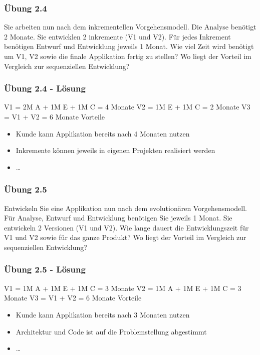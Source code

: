 \begin{frame}
\frametitle{Übung 2.4}
	Sie arbeiten nun nach dem inkrementellen Vorgehensmodell. Die Analyse benötigt 2 Monate. Sie
	entwicklen 2 inkremente (V1 und V2). Für jedes Inkrement benötigen Entwurf und Entwicklung jeweils
	1 Monat. Wie viel Zeit wird benötigt um V1, V2 sowie die finale Applikation fertig zu stellen?
	Wo liegt der Vorteil im Vergleich zur sequenziellen Entwicklung?
\end{frame}

\ifloesung
\begin{frame}
\frametitle{Übung 2.4 - Lösung}
	V1 = 2M A + 1M E + 1M C = 4 Monate
	\newline
	V2 = 1M E + 1M C = 2 Monate
	\newline
	V3 = V1 + V2 = 6 Monate
	\newline\newline
	Vorteile
	\begin{itemize}
		\item Kunde kann Applikation bereits nach 4 Monaten nutzen
		\item Inkremente können jeweils in eigenen Projekten realisiert werden
		\item \ldots
	\end{itemize}
\end{frame}
\fi

\begin{frame}
\frametitle{Übung 2.5}
	Entwickeln Sie eine Applikation nun nach dem evolutionären Vorgehensmodell. Für Analyse,
	Entwurf und Entwicklung benötigen Sie jeweils 1 Monat. Sie entwickeln 2 Versionen (V1 und V2).
	Wie lange dauert die Entwicklungszeit für V1 und V2 sowie für das ganze Produkt?
	Wo liegt der Vorteil im Vergleich zur sequenziellen Entwicklung?
\end{frame}

\ifloesung
\begin{frame}[fragile]
\frametitle{Übung 2.5 - Lösung}
	V1 = 1M A + 1M E + 1M C = 3 Monate
	\newline
	V2 = 1M A + 1M E + 1M C = 3 Monate
	\newline
	V3 = V1 + V2 = 6 Monate
	\newline\newline
	Vorteile
	\begin{itemize}
		\item Kunde kann Applikation bereits nach 3 Monaten nutzen
		\item Architektur und Code ist auf die Problemstellung abgestimmt
		\item \ldots
	\end{itemize}
\end{frame}
\fi


